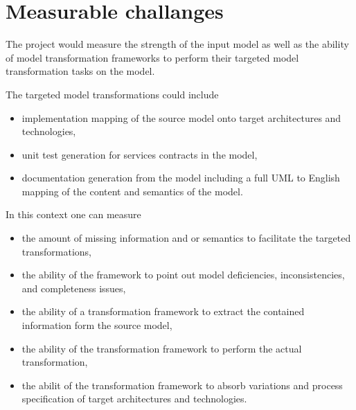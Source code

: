 \section{Measurable challanges}

The project would measure the strength of the input model as well as the ability of model transformation frameworks
to perform their targeted model transformation tasks on the model.

The targeted model transformations could include
\begin{itemize}
  \item implementation mapping of the source model onto target architectures and technologies,
  \item unit test generation for services contracts in the model,
  \item documentation generation from the model including a full UML to English mapping of the content and semantics
of the model.
\end{itemize}

In this context one can measure 
\begin{itemize}
  \item the amount of missing information and or semantics to facilitate the targeted transformations,
  \item the ability of the framework to point out model deficiencies, inconsistencies, and completeness issues,
  \item the ability of a transformation framework to extract the contained information form the source model,
  \item the ability of the transformation framework to perform the actual transformation,
  \item the abilit of the transformation framework to absorb variations and process specification of target
  architectures and technologies.
\end{itemize}



